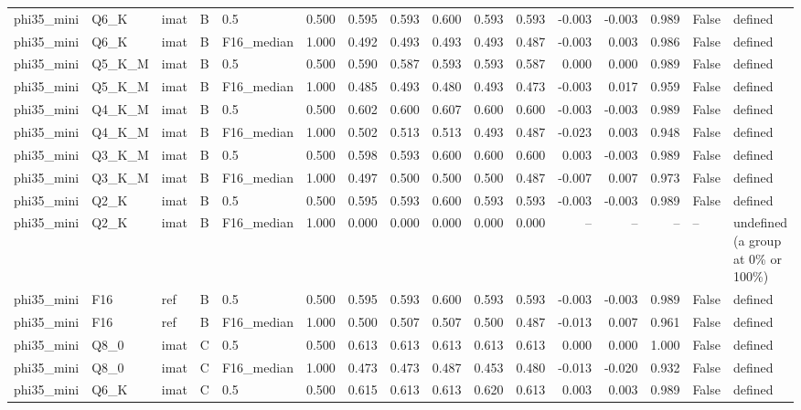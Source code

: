 \begin{tabular}{lllllrrrrrrrrrll}
phi35\_mini & Q6\_K & imat & B & 0.5 & 0.500 & 0.595 & 0.593 & 0.600 & 0.593 & 0.593 & -0.003 & -0.003 & 0.989 & False & defined \\
phi35\_mini & Q6\_K & imat & B & F16\_median & 1.000 & 0.492 & 0.493 & 0.493 & 0.493 & 0.487 & -0.003 & 0.003 & 0.986 & False & defined \\
phi35\_mini & Q5\_K\_M & imat & B & 0.5 & 0.500 & 0.590 & 0.587 & 0.593 & 0.593 & 0.587 & 0.000 & 0.000 & 0.989 & False & defined \\
phi35\_mini & Q5\_K\_M & imat & B & F16\_median & 1.000 & 0.485 & 0.493 & 0.480 & 0.493 & 0.473 & -0.003 & 0.017 & 0.959 & False & defined \\
phi35\_mini & Q4\_K\_M & imat & B & 0.5 & 0.500 & 0.602 & 0.600 & 0.607 & 0.600 & 0.600 & -0.003 & -0.003 & 0.989 & False & defined \\
phi35\_mini & Q4\_K\_M & imat & B & F16\_median & 1.000 & 0.502 & 0.513 & 0.513 & 0.493 & 0.487 & -0.023 & 0.003 & 0.948 & False & defined \\
phi35\_mini & Q3\_K\_M & imat & B & 0.5 & 0.500 & 0.598 & 0.593 & 0.600 & 0.600 & 0.600 & 0.003 & -0.003 & 0.989 & False & defined \\
phi35\_mini & Q3\_K\_M & imat & B & F16\_median & 1.000 & 0.497 & 0.500 & 0.500 & 0.500 & 0.487 & -0.007 & 0.007 & 0.973 & False & defined \\
phi35\_mini & Q2\_K & imat & B & 0.5 & 0.500 & 0.595 & 0.593 & 0.600 & 0.593 & 0.593 & -0.003 & -0.003 & 0.989 & False & defined \\
phi35\_mini & Q2\_K & imat & B & F16\_median & 1.000 & 0.000 & 0.000 & 0.000 & 0.000 & 0.000 & -- & -- & -- & -- & undefined (a group at 0\% or 100\%) \\
phi35\_mini & F16 & ref & B & 0.5 & 0.500 & 0.595 & 0.593 & 0.600 & 0.593 & 0.593 & -0.003 & -0.003 & 0.989 & False & defined \\
phi35\_mini & F16 & ref & B & F16\_median & 1.000 & 0.500 & 0.507 & 0.507 & 0.500 & 0.487 & -0.013 & 0.007 & 0.961 & False & defined \\
phi35\_mini & Q8\_0 & imat & C & 0.5 & 0.500 & 0.613 & 0.613 & 0.613 & 0.613 & 0.613 & 0.000 & 0.000 & 1.000 & False & defined \\
phi35\_mini & Q8\_0 & imat & C & F16\_median & 1.000 & 0.473 & 0.473 & 0.487 & 0.453 & 0.480 & -0.013 & -0.020 & 0.932 & False & defined \\
phi35\_mini & Q6\_K & imat & C & 0.5 & 0.500 & 0.615 & 0.613 & 0.613 & 0.620 & 0.613 & 0.003 & 0.003 & 0.989 & False & defined \\

\end{tabular}
